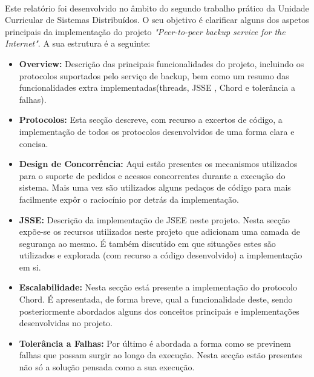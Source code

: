 \documentclass[11pt,oneside]{book}
\begin{document}
\paragraph{}
Este relatório foi desenvolvido no âmbito do segundo trabalho prático da 
Unidade Curricular de Sistemas Distribuídos. O seu objetivo é clarificar 
alguns dos aspetos principais da implementação do projeto 
\textit{"Peer-to-peer backup service for the Internet"}. A sua estrutura é a 
seguinte:
\begin{itemize}

    \item \textbf{Overview:} Descrição das principais funcionalidades do projeto, 
    incluindo os protocolos suportados pelo serviço de backup, bem como
    um resumo das funcionalidades extra implementadas(threads, JSSE , Chord 
    e tolerância a falhas).

    \item \textbf{Protocolos:} Esta secção descreve, com recurso a excertos de código, a 
    implementação de todos os protocolos desenvolvidos de uma forma clara e concisa.

    \item \textbf{Design de Concorrência:} Aqui estão presentes os mecanismos utilizados
    para o suporte de pedidos e acessos concorrentes durante a execução do sistema.
    Mais uma vez são utilizados alguns pedaços de código para mais facilmente expôr o
    raciocínio por detrás da implementação.

    \item \textbf{JSSE:} Descrição da implementação de JSEE neste projeto. Nesta secção
    expõe-se os recursos utilizados neste projeto que adicionam uma camada de segurança
    ao mesmo. É também discutido em que situações estes são utilizados e explorada
    (com recurso a código desenvolvido) a implementação em si.

    \item \textbf{Escalabilidade:} Nesta secção está presente a implementação
    do protocolo Chord. É apresentada, de forma breve, qual a funcionalidade deste,
    sendo posteriormente abordados alguns dos conceitos principais e implementações 
    desenvolvidas no projeto.
    \item \textbf{Tolerância a Falhas:} Por último é abordada a forma como se
    previnem falhas que possam surgir ao longo da execução. Nesta secção estão presentes não 
    só a solução pensada como a sua execução.

\end{itemize}     
\end{document}
